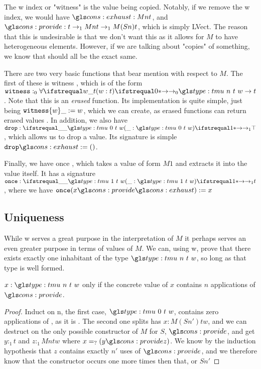 The \ident w index or "witness" is the value being copied.
Notably, if we remove the \ident w index, we would have $\mz : M n t$, and $\ms : t \to_1 M n t \to_1 M (S n) t$, which is simply \ident LVect. 
The reason that this is undesirable is that we don't want this as it allows for $M$ to have heterogeneous elements. 
However, if we are talking about "copies" of something, we know that should all be the exact same.

There are two very basic functions that bear mention with respect to $M$. The first of these is \ident witness , which is of the form $\ident witness :_0 \fa0 w : t . \tm n t w \to t$.
Note that this is an \emph{erased} function.
Its implementation is quite simple, just being $\ident witness \{w\} \_ \deq w$, which we can create, as erased functions can return erased values \needcite.
In addition, we also have $\ident drop : \fn1 \_ : {\tm 0 t w} . \top$, which allows us to drop a value.
Its signature is simple $\ident drop \mz \deq ()$.

Finally, we have \ident once , which takes a value of form $M 1$ and extracts it into the value itself.
It has a signature $\ident once : \fn1 \_ : \tm 1 t w . t$, where we have $\ident once (x \ms \mz) \deq x$

\subsection{Uniqueness}

While \ident w serves a great purpose in the interpretation of $M$ it perhaps serves an even greater purpose in terms of values of $M$.
We can, using \sigil w, prove that there exists exactly one inhabitant of the type $\tm n t w$, so long as that type is well formed.


\begin{lemma}
	$x : \tm n t w$ only if the concrete value of $x$ contains $n$ applications of $\ms$.
\end{lemma}
\begin{proof}
	Induct on \sigil n, the first case, $\tm 0 t w$, contains zero applications of \ms, as it is \mz.
	The second one splits has $x : M (S n') t w$, and we can destruct on the only possible constructor of $M$ for $S$, $\ms$, and get $y :_1 t$ and $z :_1 M n t w$ where $x \peq (y \ms z)$. 
	We know by the induction hypothesis that $z$ contains exactly $n'$ uses of $\ms$, and we therefore know that the constructor occurs one more times then that, or $S n'$
\end{proof}

